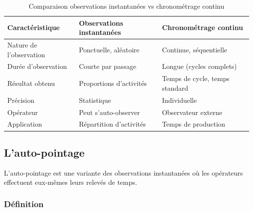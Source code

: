 \documentclass[a4paper,12pt]{article}
\begin{document}
\begin{table}[ht]
\centering
\begin{tabular}{|p{5cm}|p{4.5cm}|p{4.5cm}|}
\hline
\textbf{Caractéristique} & \textbf{Observations instantanées} & \textbf{Chronométrage continu} \\
\hline
Nature de l'observation & Ponctuelle, aléatoire & Continue, séquentielle \\
Durée d'observation & Courte par passage & Longue (cycles complets) \\
Résultat obtenu & Proportions d'activités & Temps de cycle, temps standard \\
Précision & Statistique & Individuelle \\
Opérateur & Peut s'auto-observer & Observateur externe \\
Application & Répartition d'activités & Temps de production \\
\hline
\end{tabular}
\caption{Comparaison observations instantanées vs chronométrage continu}
\end{table}

\begin{center}
\end{center}

\subsection{L'auto-pointage}

L'auto-pointage est une variante des observations instantanées où les opérateurs effectuent eux-mêmes leurs relevés de temps.

\subsubsection{Définition}
\end{document}
